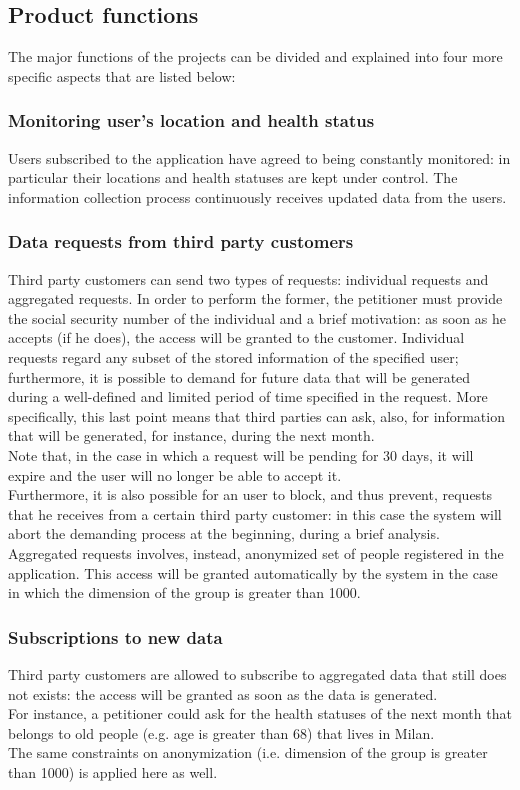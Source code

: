 \subsection{Product functions}
The major functions of the projects can be divided and explained into four more specific aspects that are listed below: 

\subsubsection{Monitoring user's location and health status}
Users subscribed to the application have agreed to being constantly monitored: in particular their locations and health statuses are kept under control. 
The information collection process continuously receives updated data from the users.\\

\subsubsection{Data requests from third party customers}
Third party customers can send two types of requests: individual requests and aggregated requests. 
In order to perform the former, the petitioner must provide the social security number of the individual and a brief motivation: as soon as he accepts (if he does), the access will be granted to the customer.
Individual requests regard any subset of the stored information of the specified user; furthermore, it is possible to demand for future data that will be generated during a well-defined and limited period of time specified in the request. 
More specifically, this last point means that third parties can ask, also, for information that will be generated, for instance, during the next month. \\
Note that, in the case in which a request will be pending for 30 days, it will expire and the user will no longer be able to accept it. \\
Furthermore, it is also possible for an user to block, and thus prevent, requests that he receives from a certain third party customer: in this case the system will abort the demanding process at the beginning, during a brief analysis.\\
Aggregated requests involves, instead, anonymized set of people registered in the application. 
This access will be granted automatically by the system in the case in which the dimension of the group is greater than 1000.   

\subsubsection{Subscriptions to new data}
Third party customers are allowed to subscribe to aggregated data that still does not exists: the access will be granted as soon as the data is generated.\\
For instance, a petitioner could ask for the health statuses of the next month that belongs to old people (e.g. age is greater than 68) that lives in Milan. \\
The same constraints on anonymization (i.e. dimension of the group is greater than 1000) is applied here as well.

